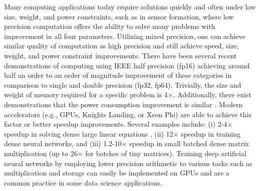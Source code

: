 \documentclass[review,onefignum,onetabnum]{siamart190516}
\begin{document}
Many computing applications today require solutions quickly and often under low size, weight, and power constraints, such as in sensor formation, where low precision computation offers the ability to solve many problems with improvement in all four parameters.
Utilizing mixed precision, one can achieve similar quality of computation as high precision and still achieve 
speed, size, weight, and power constraint improvements. 
There have been several recent demonstrations of computing using IEEE half precision (fp16) achieving around half an order to an order of magnitude improvement of these categories in comparison to single and double precision (fp32, fp64).
Trivially, the size and weight of memory required for a specific problem is 4$\times$.
Additionally, there exist demonstrations that the power consumption improvement is similar
\cite{fagan2016powerwall}.
Modern accelerators (e.g., GPUs, Knights Landing, or Xeon Phi) are able to achieve this factor or better speedup improvements.
Several examples include:
(i)   2-4$\times$ speedup in solving dense large linear equations \cite{haidar2018iterative,haidar2019tensorcore},
(ii)  12$\times$ speedup in training dense neural networks,
and
(iii) 1.2-10$\times$ speedup in small batched dense matrix multiplication \cite{abdelfattah2019batched} (up to 26$\times$ for batches of tiny matrices).
Training deep artificial neural networks by employing lower precision arithmetic to various tasks such as multiplication \cite{Courbariaux2014Mult} and storage \cite{Courbariaux2014Storage} can easily be implemented on GPUs and are a common practice in some data science applications.\par
\end{document}
